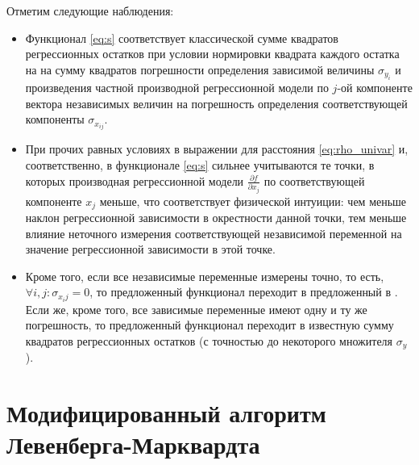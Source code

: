 \documentclass[11pt,a4paper]{article}
\begin{document}
Отметим следующие наблюдения:
\begin{itemize}
  \item Функционал \eqref{eq:s} соответствует классической сумме квадратов регрессионных
	остатков при условии нормировки квадрата каждого остатка на на сумму квадратов погрешности
	определения зависимой величины $\sigma_{y_i}$ и произведения частной производной
	регрессионной модели по $j$-ой компоненте вектора независимых величин на погрешность
	определения соответствующей компоненты $\sigma_{x_{ij}}$.

  \item При прочих равных условиях в выражении для расстояния \eqref{eq:rho_univar} и,
	соответственно, в функционале \eqref{eq:s} сильнее учитываются те точки, в которых
	производная регрессионной модели $\frac{\partial f}{\partial x_j}$ по соответствующей
	компоненте $x_j$ меньше, что соответствует физической интуиции: чем меньше наклон
	регрессионной зависимости в окрестности данной точки, тем меньше влияние неточного
	измерения соответствующей независимой переменной на значение регрессионной зависимости
	в этой точке.

  \item Кроме того, если все независимые переменные измерены точно, то есть,
	$\forall i, j : \sigma_{x_ij} = 0$, то предложенный функционал переходит в предложенный
	в \cite{...}. Если же, кроме того, все зависимые переменные имеют одну и ту же погрешность,
	то предложенный функционал переходит в известную сумму квадратов регрессионных остатков
	(с точностью до некоторого множителя $\sigma_y$).
\end{itemize}

\section{Модифицированный алгоритм Левенберга-Марквардта}
\end{document}
